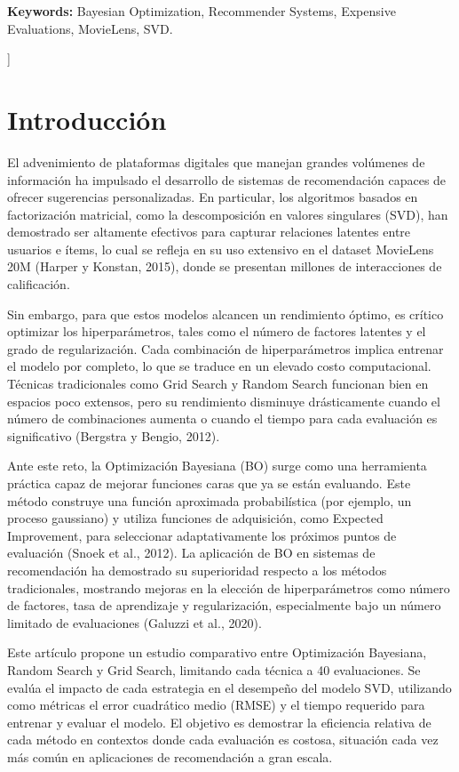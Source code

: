 \documentclass[twocolumn,10pt]{article}
\begin{document}
\noindent\textbf{Keywords:} Bayesian Optimization, Recommender Systems, Expensive Evaluations, MovieLens, SVD.

\vspace{2em}
]

\section{Introducción}

El advenimiento de plataformas digitales que manejan grandes volúmenes de información ha impulsado el desarrollo de sistemas de recomendación capaces de ofrecer sugerencias personalizadas. En particular, los algoritmos basados en factorización matricial, como la descomposición en valores singulares (SVD), han demostrado ser altamente efectivos para capturar relaciones latentes entre usuarios e ítems, lo cual se refleja en su uso extensivo en el dataset MovieLens 20M (Harper y Konstan, 2015)\citep{harper2015movielens}, donde se presentan millones de interacciones de calificación.

Sin embargo, para que estos modelos alcancen un rendimiento óptimo, es crítico optimizar los hiperparámetros, tales como el número de factores latentes y el grado de regularización. Cada combinación de hiperparámetros implica entrenar el modelo por completo, lo que se traduce en un elevado costo computacional. Técnicas tradicionales como Grid Search y Random Search funcionan bien en espacios poco extensos, pero su rendimiento disminuye drásticamente cuando el número de combinaciones aumenta o cuando el tiempo para cada evaluación es significativo (Bergstra y Bengio, 2012)\citep{bergstra2012random}.

Ante este reto, la Optimización Bayesiana (BO) surge como una herramienta práctica capaz de mejorar funciones caras que ya se están evaluando. Este método construye una función aproximada probabilística (por ejemplo, un proceso gaussiano) y utiliza funciones de adquisición, como Expected Improvement, para seleccionar adaptativamente los próximos puntos de evaluación (Snoek et al., 2012)\citep{snoek2012practical}. La aplicación de BO en sistemas de recomendación ha demostrado su superioridad respecto a los métodos tradicionales, mostrando mejoras en la elección de hiperparámetros como número de factores, tasa de aprendizaje y regularización, especialmente bajo un número limitado de evaluaciones (Galuzzi et al., 2020)\citep{galuzzi2020hyperparameter}.

Este artículo propone un estudio comparativo entre Optimización Bayesiana, Random Search y Grid Search, limitando cada técnica a 40 evaluaciones. Se evalúa el impacto de cada estrategia en el desempeño del modelo SVD, utilizando como métricas el error cuadrático medio (RMSE) y el tiempo requerido para entrenar y evaluar el modelo. El objetivo es demostrar la eficiencia relativa de cada método en contextos donde cada evaluación es costosa, situación cada vez más común en aplicaciones de recomendación a gran escala.
\end{document}
